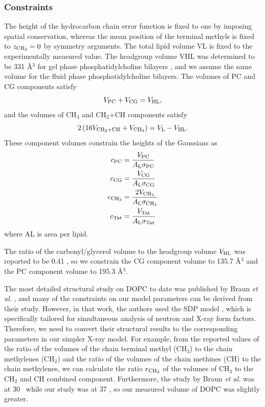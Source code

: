 \subsubsection{Constraints}
The height of the hydrocarbon chain error function is fixed to one by imposing
spatial conservation, whereas the mean position of the terminal methyls is
fixed to $z_{\textrm{CH}_3}=0$ by symmetry arguments. The total lipid volume
\gls{VL} is fixed to the experimentally measured value. 
The headgroup volume \gls{VHL} was determined to be 331 \AA$^3$ for 
gel phase phosphatidylcholine bilayers \cite{Tristram-Nagle02},
and we assume the same volume for the fluid phase phosphatidylcholine bilayers.
The volumes of PC and CG components satisfy
\begin{equation}
  V_\textrm{PC} + V_\textrm{CG} = V_\textrm{HL},
\end{equation}
and the volumes of CH$_3$ and CH$_2$+CH components satisfy
\begin{equation}
  2\left(16V_{\textrm{CH}_2+\textrm{CH}} + V_{\textrm{CH}_3}\right) = V_\textrm{L}-V_\textrm{HL}.
\end{equation}
These component volumes constrain the heights of the Gaussians as
\begin{align}
  c_\textrm{PC} &= \frac{V_\textrm{PC}}{A_\textrm{L}\sigma_\textrm{PC}} \\
  c_\textrm{CG} &= \frac{V_\textrm{CG}}{A_\textrm{L}\sigma_\textrm{CG}} \\
  c_{\textrm{CH}_3} &= \frac{2V_{\textrm{CH}_3}}{A_\textrm{L}\sigma_{\textrm{CH}_3}} \\
  c_\textrm{Tat} &= \frac{V_\textrm{Tat}}{A_\textrm{L}\sigma_\textrm{Tat}}
\end{align}
where \gls{AL} is area per lipid.

The ratio of 
the carbonyl/glycerol volume to the headgroup volume $V_\textrm{HL}$ was
reported to be 0.41 \cite{Braun13}, so we constrain the CG
component volume to 135.7 \AA$^3$ and the PC component volume to 
195.3 \AA$^3$. 

The most detailed structural study on DOPC to date was published 
by Braun \textit{et al.} \cite{Braun13}, 
and many of the constraints on our model parameters can be derived
from their study. However, in that work, the authors used the 
SDP model \cite{Kucerka08}, which is specifically tailored for
simultaneous analysis of neutron and X-ray form factors. 
Therefore, we need to convert their structural results to the 
corresponding parameters in our simpler X-ray model. For example, 
from the reported values of the ratio of the volumes of the chain terminal
methyl (CH$_3$) to the chain methylenes (CH$_2$) and the ratio of 
the volumes of the chain methines (CH) to the chain methylenes, we can
calculate the ratio $r_{\textrm{CH}_3}$ of the volumes of CH$_3$ to the CH$_2$ and
CH combined component.  
Furthermore, the study by Braun \textit{et al.} was at 30 \textcelsius\
while our study was at 37 \textcelsius, so our
measured volume of DOPC was slightly greater.

